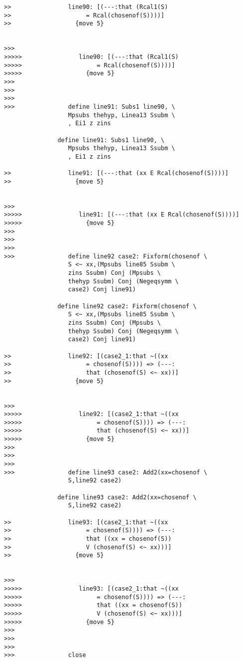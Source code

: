 \documentclass[12pt]{article}
\begin{document}
\begin{verbatim}
>>                line90: [(---:that (Rcal1(S)
>>                     = Rcal(chosenof(S))))]
>>                  {move 5}


>>>
>>>>>                line90: [(---:that (Rcal1(S)
>>>>>                     = Rcal(chosenof(S))))]
>>>>>                  {move 5}
>>>
>>>
>>>
>>>               define line91: Subs1 line90, \
                  Mpsubs thehyp, Linea13 Ssubm \
                  , Ei1 z zins

               define line91: Subs1 line90, \
                  Mpsubs thehyp, Linea13 Ssubm \
                  , Ei1 z zins

>>                line91: [(---:that (xx E Rcal(chosenof(S))))]
>>                  {move 5}


>>>
>>>>>                line91: [(---:that (xx E Rcal(chosenof(S))))]
>>>>>                  {move 5}
>>>
>>>
>>>
>>>               define line92 case2: Fixform(chosenof \
                  S <~ xx,(Mpsubs line85 Ssubm \
                  zins Ssubm) Conj (Mpsubs \
                  thehyp Ssubm) Conj (Negeqsymm \
                  case2) Conj line91)

               define line92 case2: Fixform(chosenof \
                  S <~ xx,(Mpsubs line85 Ssubm \
                  zins Ssubm) Conj (Mpsubs \
                  thehyp Ssubm) Conj (Negeqsymm \
                  case2) Conj line91)

>>                line92: [(case2_1:that ~((xx
>>                     = chosenof(S)))) => (---:
>>                     that (chosenof(S) <~ xx))]
>>                  {move 5}


>>>
>>>>>                line92: [(case2_1:that ~((xx
>>>>>                     = chosenof(S)))) => (---:
>>>>>                     that (chosenof(S) <~ xx))]
>>>>>                  {move 5}
>>>
>>>
>>>
>>>               define line93 case2: Add2(xx=chosenof \
                  S,line92 case2)

               define line93 case2: Add2(xx=chosenof \
                  S,line92 case2)

>>                line93: [(case2_1:that ~((xx
>>                     = chosenof(S)))) => (---:
>>                     that ((xx = chosenof(S))
>>                     V (chosenof(S) <~ xx)))]
>>                  {move 5}


>>>
>>>>>                line93: [(case2_1:that ~((xx
>>>>>                     = chosenof(S)))) => (---:
>>>>>                     that ((xx = chosenof(S))
>>>>>                     V (chosenof(S) <~ xx)))]
>>>>>                  {move 5}
>>>
>>>
>>>
>>>               close


\end{verbatim}
\end{document}
